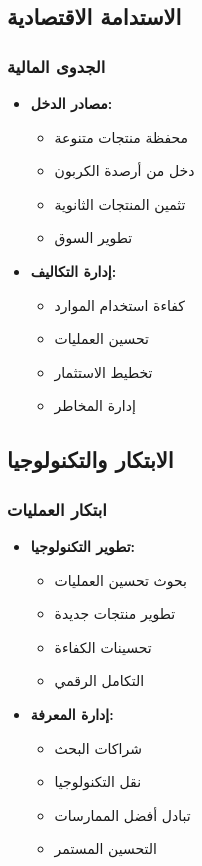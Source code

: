 \subsection{الاستدامة الاقتصادية}

\subsubsection{الجدوى المالية}
\begin{itemize}
    \item \textbf{مصادر الدخل:}
    \begin{itemize}
        \item محفظة منتجات متنوعة
        \item دخل من أرصدة الكربون
        \item تثمين المنتجات الثانوية
        \item تطوير السوق
    \end{itemize}
    
    \item \textbf{إدارة التكاليف:}
    \begin{itemize}
        \item كفاءة استخدام الموارد
        \item تحسين العمليات
        \item تخطيط الاستثمار
        \item إدارة المخاطر
    \end{itemize}
\end{itemize}

\subsection{الابتكار والتكنولوجيا}

\subsubsection{ابتكار العمليات}
\begin{itemize}
    \item \textbf{تطوير التكنولوجيا:}
    \begin{itemize}
        \item بحوث تحسين العمليات
        \item تطوير منتجات جديدة
        \item تحسينات الكفاءة
        \item التكامل الرقمي
    \end{itemize}
    
    \item \textbf{إدارة المعرفة:}
    \begin{itemize}
        \item شراكات البحث
        \item نقل التكنولوجيا
        \item تبادل أفضل الممارسات
        \item التحسين المستمر
    \end{itemize}
\end{itemize}

